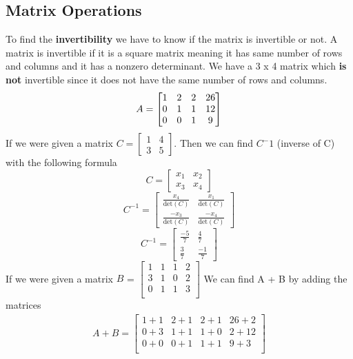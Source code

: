 \documentclass[12pt]{article}
\begin{document}
\subsection{Matrix Operations}
To find the \textbf{invertibility} we have to know if the matrix is invertible or not. A matrix is invertible if it is a square matrix meaning it has same number of rows and columns and it has a nonzero determinant. We have a 3 x 4 matrix which \textbf{is not} invertible since it does not have the same number of rows and columns.
\newline
\begin{align*}
A = \begin{bmatrix}
  1 & 2 & 2 & 26 \\
  0 & 1 & 1 & 12 \\
 0 & 0 & 1 & 9 \\
\end{bmatrix}
\bigskip
\end{align*}
If we were given a matrix $C = \begin{bmatrix}1 & 4 \\ 3 & 5\end{bmatrix}$. Then we can find $C^-1$ (inverse of C) with the following formula
\begin{equation*}C = \begin{bmatrix}x_1 & x_2 \\ x_3 & x_4\end{bmatrix}\end{equation*}
\begin{equation*}C^{-1} = \begin{bmatrix}\frac{x_4}{\text{det}(C)} & \frac{x_1}{\text{det}(C)}\\ \frac{-x_3}{\text{det}(C)} & \frac{-x_4}{\text{det}(C)}\end{bmatrix}\end{equation*}
\begin{equation*}C^{-1}= \begin{bmatrix}\frac{-5}{7} & \frac{4}{7}\\ \frac{3}{7} & \frac{-1}{7}\end{bmatrix}\end{equation*}
If we were given a matrix $B$ = 
 $\begin{bmatrix}
 1 & 1 & 1 & 2 \\
  3 & 1 & 0 & 2 \\
 0 & 1 & 1 & 3 \\
 \end{bmatrix}$
 We can find A + B by adding the matrices
 \begin{align*}
A +B = \begin{bmatrix}
 1+1 & 2+1 & 2+1 & 26+2 \\
  0+3 & 1+1 & 1+0 & 2+12 \\
 0+0 & 0+1 & 1+1 & 9+3 \\
 \end{bmatrix}
 \end{align*}
\end{document}
